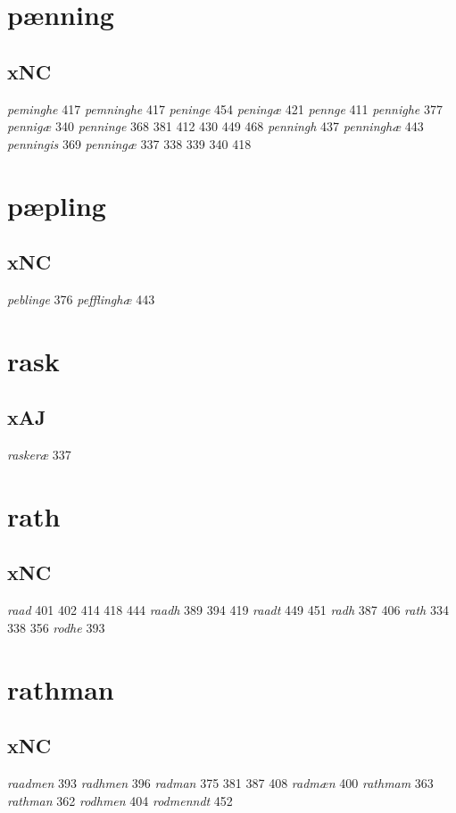 \documentclass[a4paper,twocolumn]{article}
\begin{document}
\section{pænning}
\label{sec:org026fa28}
\subsection{xNC}
\label{sec:orgd0a22d5}
\emph{peminghe} 417 \emph{pemninghe} 417 \emph{peninge} 454 \emph{peningæ} 421 \emph{pennge} 411 \emph{pennighe} 377 \emph{pennigæ} 340 \emph{penninge} 368 381 412 430 449 468 \emph{penningh} 437 \emph{penninghæ} 443 \emph{penningis} 369 \emph{penningæ} 337 338 339 340 418 
\section{pæpling}
\label{sec:org1cb5c46}
\subsection{xNC}
\label{sec:org2f7bdfe}
\emph{peblinge} 376 \emph{pefflinghæ} 443 
\section{rask}
\label{sec:org4d7c760}
\subsection{xAJ}
\label{sec:orgc80e6b5}
\emph{raskeræ} 337 
\section{rath}
\label{sec:org76c5219}
\subsection{xNC}
\label{sec:org17e7133}
\emph{raad} 401 402 414 418 444 \emph{raadh} 389 394 419 \emph{raadt} 449 451 \emph{radh} 387 406 \emph{rath} 334 338 356 \emph{rodhe} 393 
\section{rathman}
\label{sec:org7df488d}
\subsection{xNC}
\label{sec:org5bf2fa5}
\emph{raadmen} 393 \emph{radhmen} 396 \emph{radman} 375 381 387 408 \emph{radmæn} 400 \emph{rathmam} 363 \emph{rathman} 362 \emph{rodhmen} 404 \emph{rodmenndt} 452 
\end{document}
